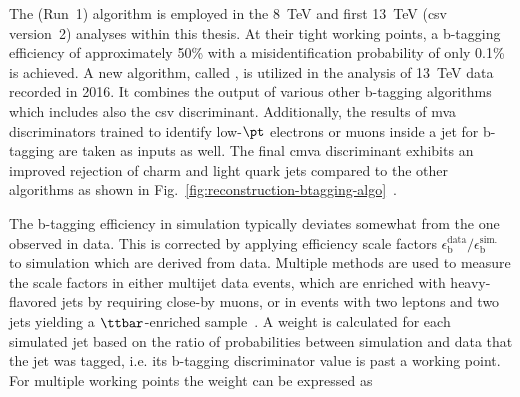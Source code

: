 
The  (Run~1) algorithm is employed in the 8~TeV and first 13~TeV (\gls{csv} version~2) analyses within this thesis. At their tight working points, a b-tagging efficiency of approximately 50\% with a misidentification probability of only 0.1\% is achieved. A new algorithm, called , is utilized in the analysis of 13~TeV data recorded in 2016. It combines the output of various other b-tagging algorithms which includes also the \gls{csv} discriminant. Additionally, the results of \gls{mva} discriminators trained to identify low-$\pt$ electrons or muons inside a jet for b-tagging are taken as inputs as well. The final \gls{cmva} discriminant exhibits an improved rejection of charm and light quark jets compared to the other algorithms as shown in Fig.~\ref{fig:reconstruction-btagging-algo}~\cite{CMS-PAS-BTV-15-001}.

The b-tagging efficiency in simulation typically deviates somewhat from the one observed in data. This is corrected by applying efficiency scale factors $\epsilon_\mathrm{b}^\mathrm{data}/\epsilon_\mathrm{b}^\mathrm{sim.}$ to simulation which are derived from data. Multiple methods are used to measure the scale factors in either multijet data events, which are enriched with heavy-flavored jets by requiring close-by muons, or in events with two leptons and two jets yielding a $\ttbar$-enriched sample~\cite{CMS-PAS-BTV-13-001}. A weight is calculated for each simulated jet based on the ratio of probabilities between simulation and data that the jet was tagged, i.e. its b-tagging discriminator value is past a working point. For multiple working points the weight can be expressed as

